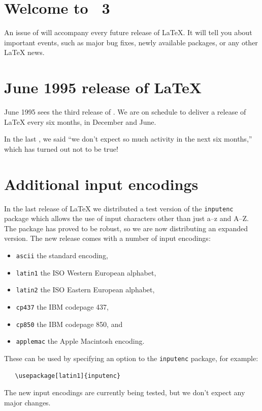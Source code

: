 \documentclass{ltnews}
\providecommand\pkg[1]{\texttt{#1}}
\providecommand\option[1]{\texttt{#1}}
\begin{document}
\maketitle

\section{Welcome to \LaTeXNews~3}

An  issue of \emph{\LaTeXNews} will accompany every future release of
\LaTeX.  It will tell you about important events, such as major bug
fixes, newly available packages, or any other \LaTeX{} news.

\section{June 1995 release of \LaTeX}

June 1995 sees the third release of \LaTeXe.  We are on schedule
to deliver a release of \LaTeX{} every six months, in December and
June.

In the last \emph{\LaTeXNews}, we said ``we don't expect so much
activity in the next six months,'' which has turned out not to be
true!

\section{Additional input encodings}

In the last release of \LaTeX{} we distributed a test version of the
\pkg{inputenc} package which allows the use of input characters
other than just a--z and A--Z.  The package has proved to be robust,
so we are now distributing an expanded version.
The new release comes with a number of input encodings:

\begin{itemize}
\item \option{ascii} the standard encoding,
\item \option{latin1} the ISO Western European alphabet,
\item \option{latin2} the ISO Eastern European alphabet,
\item \option{cp437} the IBM codepage 437,
\item \option{cp850} the IBM codepage 850, and
\item \option{applemac} the Apple Macintosh encoding.
\end{itemize}
These can be used by specifying an option to the \pkg{inputenc}
package, for example:
\begin{verbatim}
   \usepackage[latin1]{inputenc}
\end{verbatim}
The new input encodings are currently being tested, but we don't
expect any major changes.
\end{document}
